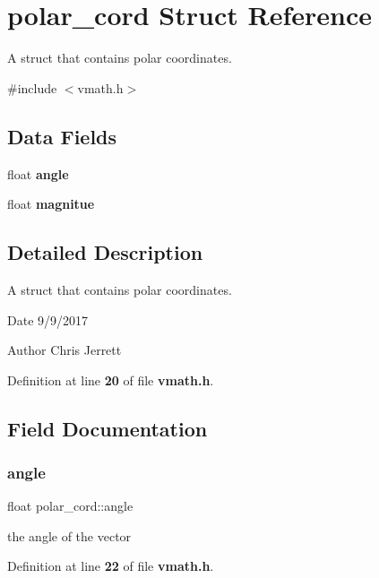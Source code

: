 \section{polar\+\_\+cord Struct Reference}
\label{structpolar__cord}


A struct that contains polar coordinates.  




{\ttfamily \#include $<$vmath.\+h$>$}

\subsection*{Data Fields}
\begin{DoxyCompactItemize}
\item 
float \textbf{ angle}
\item 
float \textbf{ magnitue}
\end{DoxyCompactItemize}


\subsection{Detailed Description}
A struct that contains polar coordinates. 

\begin{DoxyDate}{Date}
9/9/2017 
\end{DoxyDate}
\begin{DoxyAuthor}{Author}
Chris Jerrett 
\end{DoxyAuthor}


Definition at line \textbf{ 20} of file \textbf{ vmath.\+h}.



\subsection{Field Documentation}
\mbox{\label{structpolar__cord_a81b3a11d38d76719b02fcd425adaa216}} 
\subsubsection{angle}
{\footnotesize\ttfamily float polar\+\_\+cord\+::angle}

the angle of the vector 

Definition at line \textbf{ 22} of file \textbf{ vmath.\+h}.



